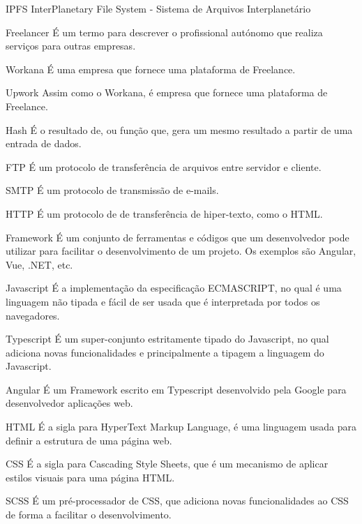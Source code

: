 \begin{siglas}
    \item[IPFS] InterPlanetary File System - Sistema de Arquivos Interplanetário
    \item[Freelancer] É um termo para descrever o profissional autónomo que realiza
serviços para outras empresas.
    \item[Workana] É uma empresa que fornece uma plataforma de Freelance.
    \item[Upwork] Assim como o Workana, é empresa que fornece uma plataforma de Freelance.
    \item[Hash] É o resultado de, ou função que, gera um mesmo resultado a partir de uma entrada de dados.
    \item[FTP] É um protocolo de transferência de arquivos entre servidor e cliente.
    \item[SMTP] É um protocolo de transmissão de e-mails.
    \item[HTTP] É um protocolo de de transferência de hiper-texto, como o HTML.
    \item[Framework] É um conjunto de ferramentas e códigos que um desenvolvedor pode utilizar para facilitar o desenvolvimento de um projeto. Os exemplos são Angular, Vue, .NET, etc.
    \item[Javascript] É a implementação da especificação ECMASCRIPT, no qual é uma linguagem não tipada e fácil de ser usada que é interpretada por todos os navegadores.
    \item[Typescript] É um super-conjunto estritamente tipado do Javascript, no qual adiciona novas funcionalidades e principalmente a tipagem a linguagem do Javascript.
    \item[Angular] É um Framework escrito em Typescript desenvolvido pela Google para desenvolvedor aplicações web.
    \item[HTML] É a sigla para HyperText Markup Language, é uma linguagem usada para definir a estrutura de uma página web.
    \item[CSS] É a sigla para Cascading Style Sheets, que é um mecanismo de aplicar estilos visuais para uma página HTML.
    \item[SCSS] É um pré-processador de CSS, que adiciona novas funcionalidades ao CSS de forma a facilitar o desenvolvimento.
\end{siglas}